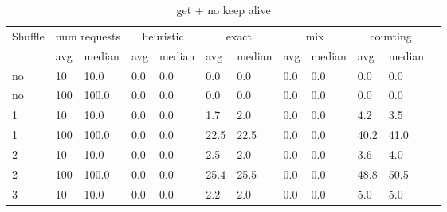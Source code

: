 \documentclass[a4paper]{report}
\begin{document}
\begin{table}[h]
	\centering
	\caption{get + no keep alive}
	\label{tab:get}
	\begin{tabular}{|l|l|l|l|l|l|l|l|l|l|l|l|}
		\hline
		\multirow{2}{*}{Shuffle} & \multicolumn{2}{|c|}{num requests} & \multicolumn{2}{|c|}{heuristic} & \multicolumn{2}{|c|}{exact} & \multicolumn{2}{|c|}{mix} & \multicolumn{2}{|c|}{counting}                                         \\ \cline{2-11}
		                         & avg                                & median                          & avg                         & median                    & avg                            & median & avg & median & avg  & median \\ \hline
		no                       & 10                                 & 10.0                            & 0.0                         & 0.0                       & 0.0                            & 0.0    & 0.0 & 0.0    & 0.0  & 0.0    \\ \hline
		no                       & 100                                & 100.0                           & 0.0                         & 0.0                       & 0.0                            & 0.0    & 0.0 & 0.0    & 0.0  & 0.0    \\ \hline
		1                        & 10                                 & 10.0                            & 0.0                         & 0.0                       & 1.7                            & 2.0    & 0.0 & 0.0    & 4.2  & 3.5    \\ \hline
		1                        & 100                                & 100.0                           & 0.0                         & 0.0                       & 22.5                           & 22.5   & 0.0 & 0.0    & 40.2 & 41.0   \\ \hline
		2                        & 10                                 & 10.0                            & 0.0                         & 0.0                       & 2.5                            & 2.0    & 0.0 & 0.0    & 3.6  & 4.0    \\ \hline
		2                        & 100                                & 100.0                           & 0.0                         & 0.0                       & 25.4                           & 25.5   & 0.0 & 0.0    & 48.8 & 50.5   \\ \hline
		3                        & 10                                 & 10.0                            & 0.0                         & 0.0                       & 2.2                            & 2.0    & 0.0 & 0.0    & 5.0  & 5.0    \\ \hline

\end{tabular}
\end{table}
\end{document}
